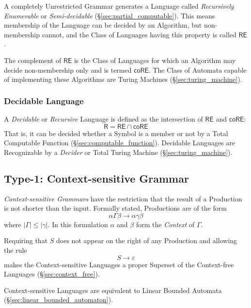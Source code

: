 A completely Unrestricted Grammar generates a Language called
\emph{Recursively Enumerable} or \emph{Semi-decidable}
(\S\ref{sec:partial_computable}). This means membership of the
Language can be decided by an Algorithm, but non-membership cannot,
and the Class of Languages having this property is called
$\mathsf{RE}$.

The complement of $\mathsf{RE}$ is the Class of Languages for which an
Algorithm may decide non-membership only and is termed
$\mathsf{coRE}$. The Class of Automata capable of implementing these
Algorithms are Turing Machines (\S\ref{sec:turing_machine}).



\subsubsection{Decidable Language}\label{sec:decidable_language}

A \emph{Decidable} or \emph{Recursive} Language is defined as the
intersection of $\mathsf{RE}$ and $\mathsf{coRE}$:
\[
  \mathsf{R} = \mathsf{RE} \cap \mathsf{coRE}
\]
That is, it can be decided whether a Symbol is a member or not by a
Total Computable Function (\S\ref{sec:computable_function}). Decidable
Languages are Recognizable by a \emph{Decider} or Total Turing Machine
(\S\ref{sec:turing_machine}).\cite{kozen97}



\subsection{Type-1: Context-sensitive Grammar}
\label{sec:context_sensitive}

\emph{Context-sensitive Grammars} have the restriction that the result
of a Production is not shorter than the input. Formally stated,
Productions are of the form
\[
  \alpha \Gamma \beta \rightarrow \alpha \gamma \beta
\]
where $|\Gamma| \leq |\gamma|$. In this formulation $\alpha$ and
$\beta$ form the \emph{Context} of $\Gamma$.

Requiring that $S$ does not appear on the right of any Production
and allowing the rule
\[
  S \rightarrow \varepsilon
\]
makes the Context-sensitive Languages a proper Superset of the
Context-free Languages (\S\ref{sec:context_free}).

Context-sensitive Languages are equivalent to Linear Bounded Automata
(\S\ref{sec:linear_bounded_automaton}).



